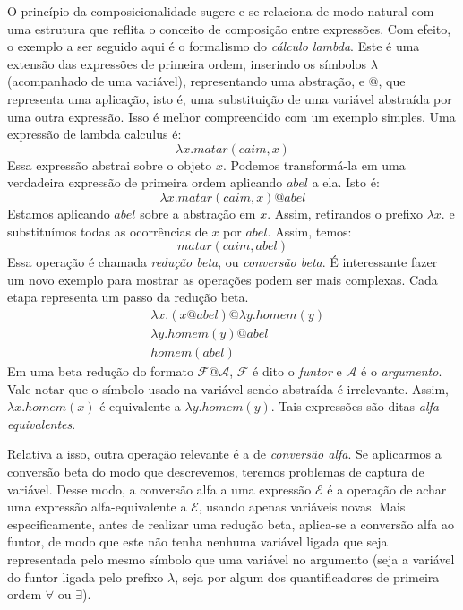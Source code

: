 \documentclass[12pt, a4paper, twoside]{article}
\begin{document}
O princípio da composicionalidade sugere e se relaciona de modo natural com uma estrutura que reflita o conceito de composição entre expressões. Com efeito, o exemplo a ser seguido aqui é o formalismo do \textsl{cálculo lambda}. Este é uma extensão das expressões de primeira ordem, inserindo os símbolos $\lambda$ (acompanhado de uma variável), representando uma abstração, e $@$, que representa uma aplicação, isto é, uma substituição de uma variável abstraída por uma outra expressão. Isso é melhor compreendido com um exemplo simples. Uma expressão de lambda calculus é:
\begin{equation*}
\lambda x. matar(caim,x)
\end{equation*}
Essa expressão abstrai sobre o objeto $x$. Podemos transformá-la em uma verdadeira expressão de primeira ordem aplicando $abel$ a ela. Isto é:
\begin{equation*}
\lambda x. matar(caim,x) @ abel
\end{equation*}
Estamos aplicando $abel$ sobre a abstração em $x$. Assim, retirandos o prefixo $\lambda x .$ e substituímos todas as ocorrências de $x$ por $abel$. Assim, temos:
\begin{equation*}
matar(caim,abel)
\end{equation*}
Essa operação é chamada \textsl{redução beta}, ou \textsl{conversão beta}. É interessante fazer um novo exemplo para mostrar as operações podem ser mais complexas. Cada etapa representa um passo da redução beta.
\begin{equation*}
\begin{split}
& \lambda x.(x@abel) @ \lambda y. homem(y) \\
& \lambda y. homem(y) @ abel \\
& homem(abel)
\end{split}
\end{equation*}
Em uma beta redução do formato $\mathcal{F}@\mathcal{A}$, $\mathcal{F}$ é dito o \textit{funtor} e $\mathcal{A}$ é o \textit{argumento}. Vale notar que o símbolo usado na variável sendo abstraída é irrelevante. Assim, $\lambda x . homem(x)$ é equivalente a $\lambda y. homem(y)$. Tais expressões são ditas \textsl{alfa-equivalentes}.
 
Relativa a isso, outra operação relevante é a de \textsl{conversão alfa}. Se aplicarmos a conversão beta do modo que descrevemos, teremos problemas de captura de variável. Desse modo, a conversão alfa a uma expressão $\mathcal{E}$ é a operação de achar uma expressão alfa-equivalente a $\mathcal{E}$, usando apenas variáveis novas. Mais especificamente, antes de realizar uma redução beta, aplica-se a conversão alfa ao funtor, de modo que este não tenha nenhuma variável ligada que seja representada pelo mesmo símbolo que uma variável no argumento (seja a variável do funtor ligada pelo prefixo $\lambda$, seja por algum dos quantificadores de primeira ordem $\forall$ ou $\exists$).
\end{document}
